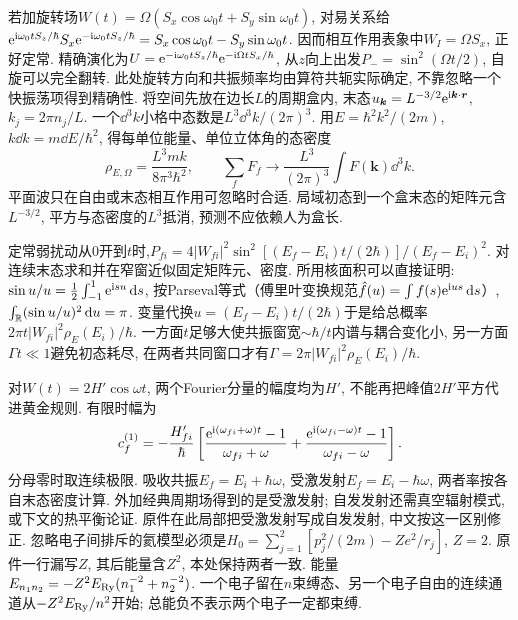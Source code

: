 若加旋转场$W(t)=\Omega(S_x\cos\omega_0t+S_y\sin\omega_0t)$, 对易关系给$\mathrm e^{\mathrm i\omega_0tS_z/\hbar}S_x\mathrm e^{-\mathrm i\omega_0tS_z/\hbar}=S_x\cos\omega_0t-S_y\sin\omega_0t$. 因而相互作用表象中$W_I=\Omega S_x$, 正好定常. 精确演化为$U=\mathrm e^{-\mathrm i\omega_0tS_z/\hbar}\mathrm e^{-\mathrm i\Omega tS_x/\hbar}$, 从$z$向上出发$P_-=\sin^2(\Omega t/2)$, 自旋可以完全翻转. 此处旋转方向和共振频率均由算符共轭实际确定, 不靠忽略一个快振荡项得到精确性.
将空间先放在边长$L$的周期盒内, 末态$u_{\boldsymbol k}=L^{-3/2}\mathrm e^{\mathrm i\boldsymbol k\cdot\boldsymbol r}$, $k_j=2\pi n_j/L$. 一个$\dd^3k$小格中态数是$L^3\dd^3k/(2\pi)^3$. 用$E=\hbar^2k^2/(2m)$, $k\dd k=m\dd E/\hbar^2$, 得每单位能量、单位立体角的态密度
\[
\rho_{E,\Omega}=\frac{L^3mk}{8\pi^3\hbar^2},\qquad
\sum_fF_f\longrightarrow\frac{L^3}{(2\pi)^3}\int F(\boldsymbol k)\dd^3k.
\]
平面波只在自由或末态相互作用可忽略时合适. 局域初态到一个盒末态的矩阵元含$L^{-3/2}$, 平方与态密度的$L^3$抵消, 预测不应依赖人为盒长.

定常弱扰动从0开到$t$时,$P_{fi}=4|W_{fi}|^2\sin^2[(E_f-E_i)t/(2\hbar)]/(E_f-E_i)^2$. 对连续末态求和并在窄窗近似固定矩阵元、密度. 所用核面积可以直接证明: $\sin u/u=\tfrac12\int_{-1}^1\mathrm e^{\mathrm i su}\,\mathrm d s$, 按Parseval等式（傅里叶变换规范$\hat f(u)=\int f(s)\mathrm e^{\mathrm i us}\,\mathrm d s$）, $\int_{\mathbb R}(\sin u/u)^2\,\mathrm d u=\pi$. 变量代换$u=(E_f-E_i)t/(2\hbar)$于是给总概率$2\pi t|W_{fi}|^2\rho_E(E_i)/\hbar$. 一方面$t$足够大使共振窗宽$\sim\hbar/t$内谱与耦合变化小, 另一方面$\Gamma t\ll1$避免初态耗尽, 在两者共同窗口才有$\Gamma=2\pi|W_{fi}|^2\rho_E(E_i)/\hbar$.

对$W(t)=2H'\cos\omega t$, 两个Fourier分量的幅度均为$H'$, 不能再把峰值$2H'$平方代进黄金规则. 有限时幅为
\[
c_f^{(1)}=-\frac{H'_{fi}}{\hbar}\left[
\frac{\mathrm e^{\mathrm i(\omega_{fi}+\omega)t}-1}{\omega_{fi}+\omega}
+\frac{\mathrm e^{\mathrm i(\omega_{fi}-\omega)t}-1}{\omega_{fi}-\omega}\right].
\]
分母零时取连续极限. 吸收共振$E_f=E_i+\hbar\omega$, 受激发射$E_f=E_i-\hbar\omega$, 两者率按各自末态密度计算. 外加经典周期场得到的是受激发射; 自发发射还需真空辐射模式, 或下文的热平衡论证. 原件在此局部把受激发射写成自发发射, 中文按这一区别修正.
忽略电子间排斥的氦模型必须是$H_0=\sum_{j=1}^2[p_j^2/(2m)-Ze^2/r_j]$, $Z=2$. 原件一行漏写$Z$, 其后能量含$Z^2$, 本处保持两者一致. 能量$E_{n_1n_2}=-Z^2E_{\rm Ry}(n_1^{-2}+n_2^{-2})$. 一个电子留在$n$束缚态、另一个电子自由的连续通道从$-Z^2E_{\rm Ry}/n^2$开始; 总能负不表示两个电子一定都束缚.

